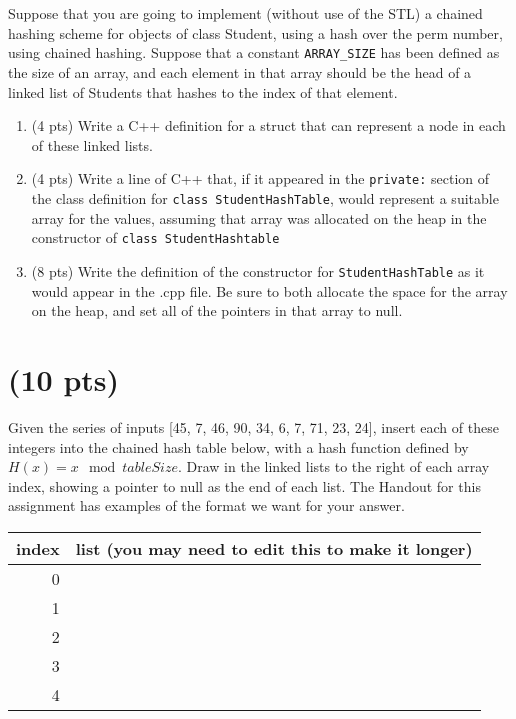 \documentclass[11pt]{article}
\begin{document}
\section{}
\label{sec:orgb45c31c}
Suppose that you are going to implement (without use of the STL) a chained
hashing scheme for objects of class Student, using a hash over the perm
number, using chained hashing. Suppose that a constant \texttt{ARRAY\_SIZE}
has been defined as the size of an array, and each element in that array
should be the head of a linked list of Students that hashes to the index of
that element.
\begin{enumerate}
\item (4 pts) Write a C++ definition for a struct that can
represent a node in each of these linked lists.
\vspace{8em}
\item (4 pts) Write a line of C++ that, if it appeared in the \texttt{private:} section
of the class definition for \texttt{class StudentHashTable}, would represent a
suitable array for the values, assuming that array was allocated on the heap
in the constructor of \texttt{class StudentHashtable}
\vspace{8em}
\item (8 pts) Write the definition of the constructor for
\texttt{StudentHashTable} as it would appear in the .cpp file. Be sure
to both allocate the space for the array on the heap, and set
all of the pointers in that array to null.
\vspace{10em}
\end{enumerate}

\section{(10 pts)}
\label{sec:org72c5b2a}
  Given the series of inputs [45, 7, 46, 90, 34, 6, 7, 71, 23, 24], insert each
of these integers into the chained hash table below, with a hash function
defined by \(H(x)= x \mod \mathit{tableSize}\). Draw in the linked lists to the
right of each array index, showing a pointer to null as the end of each
list. The Handout for this assignment has examples of the format we want for
your answer.

\begin{center}
\begin{tabular}{rl}
index & list (you may need to edit this to make it longer)\\
\hline
0 & \\
\hline
1 & \\
\hline
2 & \\
\hline
3 & \\
\hline
4 & \\
\end{tabular}
\end{center}
\end{document}
